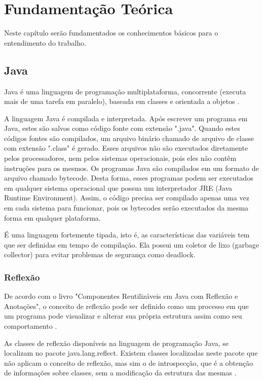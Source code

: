 \chapter{Fundamentação Teórica}
\label{ch:fundamentacao}
\par Neste capítulo ser\~ao fundamentados os conhecimentos b\'asicos para o entendimento do trabalho.


\section{Java}

\par Java é uma linguagem de programação multiplataforma, concorrente (executa mais de uma tarefa em paralelo), baseada em classes e orientada a objetos \cite{joy2000java}.
\par A linguagem Java é compilada e interpretada. Após escrever um programa em Java, estes são salvos como código fonte com extensão ".java". Quando estes códigos fontes são compilados, um arquivo binário chamado de arquivo de classe com extensão ".class" é gerado. Esses arquivos não são executados diretamente pelos processadores, nem pelos sistemas operacionais, pois eles não contêm instruções para os mesmos. Os programas Java são compilados em um formato de arquivo chamado bytecode. Desta forma, esses programas podem ser executados em qualquer sistema operacional que possua um interpretador JRE (Java Runtime Environment). Assim, o código precisa ser compilado apenas uma vez em cada sistema para funcionar, pois os bytecodes serão executados da mesma forma em qualquer plataforma\cite{indrusiak1996linguagem}.
\par É uma linguagem fortemente tipada, isto é, as características das variáveis tem que ser definidas em tempo de compilação. Ela possui um coletor de lixo (garbage collector) para evitar problemas de segurança como deadlock. \cite{joy2000java}

\subsection{Reflexão}

\par De acordo com o livro "Componentes Reutilizáveis em Java com Reflexão e Anotações", o conceito de reflexão pode ser definido como um processo em que um programa pode visualizar e alterar sua própria estrutura assim como seu comportamento \cite{guerra2014componentes}.
\par As classes de reflexão disponíveis na linguagem de programação Java, se localizam no pacote java.lang.reflect. Existem classes localizadas neste pacote que não aplicam o conceito de reflexão, mas sim o de introspecção, que é a obtenção de informações sobre classes, sem a modificação da estrutura das mesmas \cite{guerra2014componentes}.

